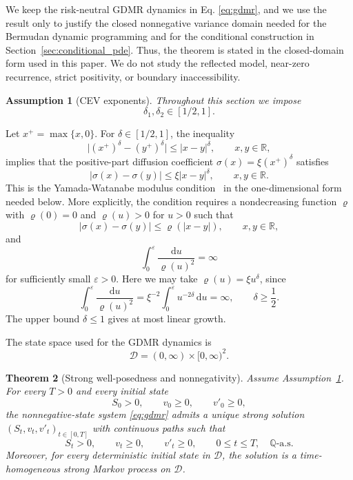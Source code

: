 \documentclass[pdflatex,sn-mathphys-num]{sn-jnl}
\theoremstyle{thmstyleone}%
\newtheorem{theorem}{Theorem}[section]
\theoremstyle{thmstylethree}%
\newtheorem{assumption}[theorem]{Assumption}
\theoremstyle{thmstyletwo}%
\newcommand{\dd}{\mathrm d}
\newcommand{\Q}{\mathbb Q}
\newcommand{\R}{\mathbb R}
\begin{document}
We keep the risk-neutral GDMR dynamics in Eq. \eqref{eq:gdmr}, and we use the result only to justify the closed nonnegative variance domain needed for the Bermudan dynamic programming and for the conditional construction in Section~\ref{sec:conditional_pde}. Thus, the theorem is stated in the closed-domain form used in this paper. We do not study the reflected model, near-zero recurrence, strict positivity, or boundary inaccessibility.





\begin{assumption}[CEV exponents]\label{ass:delta-range}
Throughout this section we impose
$$
\delta_1,\delta_2\in[1/2,1].
$$
\end{assumption}

Let $x^+=\max\{x,0\}$. For $\delta\in[1/2,1]$, the inequality
$$
\bigl|(x^+)^\delta-(y^+)^\delta\bigr|
\le |x-y|^\delta,\qquad x,y\in\R,
$$
implies that the positive-part diffusion coefficient
$\sigma(x)=\xi(x^+)^\delta$ satisfies
$$
|\sigma(x)-\sigma(y)|
\le \xi |x-y|^\delta,\qquad x,y\in\R.
$$
This is the Yamada-Watanabe modulus condition~\cite{yamada1971uniqueness} in
the one-dimensional form needed below. More explicitly, the condition requires a
nondecreasing function $\varrho$ with $\varrho(0)=0$ and $\varrho(u)>0$ for
$u>0$ such that
$$
|\sigma(x)-\sigma(y)|\le \varrho(|x-y|),\qquad x,y\in\R,
$$
and
$$
\int_0^\varepsilon \frac{\dd u}{\varrho(u)^2}
=
\infty
$$
for sufficiently small $\varepsilon>0$. Here we may take
$\varrho(u)=\xi u^\delta$, since
$$
\int_0^\varepsilon \frac{\dd u}{\varrho(u)^2}
=
\xi^{-2}\int_0^\varepsilon u^{-2\delta}\,\dd u
=
\infty,\qquad \delta\ge\frac12.
$$
The upper bound $\delta\le1$ gives at most linear growth.

The state space used for the GDMR dynamics is
$$
\mathcal D=(0,\infty)\times[0,\infty)^2.
$$

\begin{theorem}[Strong well-posedness and nonnegativity]\label{thm:wellposed}
Assume Assumption~\ref{ass:delta-range}. For every $T>0$ and every initial
state
$$
S_0>0,\qquad v_0\ge0,\qquad v'_0\ge0,
$$
the nonnegative-state system \eqref{eq:gdmr} admits a unique strong solution
$(S_t,v_t,v'_t)_{t\in[0,T]}$ with continuous paths such that
$$
S_t>0,\qquad v_t\ge0,\qquad v'_t\ge0,\qquad
0\le t\le T,\quad \Q\text{-a.s.}
$$
Moreover, for every deterministic initial state in $\mathcal D$, the solution
is a time-homogeneous strong Markov process on $\mathcal D$.
\end{theorem}
\end{document}
